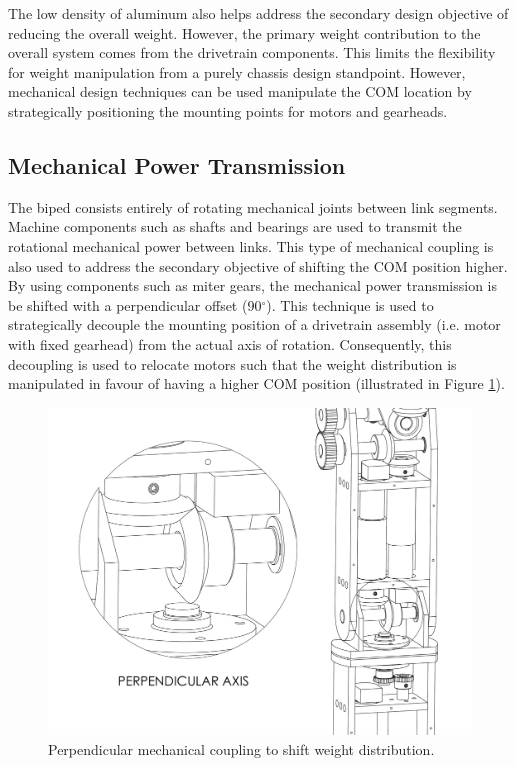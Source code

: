The low density of aluminum also helps address the secondary design objective of reducing the overall weight. However, the primary weight contribution to the overall system comes from the drivetrain components. This limits the flexibility for weight manipulation from a purely chassis design standpoint. However, mechanical design techniques can be used manipulate the COM location by strategically positioning the mounting points for motors and gearheads. 

\subsection{Mechanical Power Transmission} %
\label{sub:mechanical_power_transmission}
The biped consists entirely of rotating mechanical joints between link segments. Machine components such as shafts and bearings are used to transmit the rotational mechanical power between links. This type of mechanical coupling is also used to address the secondary objective of shifting the COM position higher. By using components such as miter gears, the mechanical power transmission is be shifted with a perpendicular offset (90$^\circ$). This technique is used to strategically decouple the mounting position of a drivetrain assembly (i.e. motor with fixed gearhead) from the actual axis of rotation. Consequently, this decoupling is used to relocate motors such that the weight distribution is manipulated in favour of having a higher COM position (illustrated in Figure \ref{fig:miter}).
	
\begin{figure}[!h]
	\begin{center}
    \includegraphics[scale=0.5]{fig/design/perpendicular.pdf}
	\end{center}
  \caption{Perpendicular mechanical coupling to shift weight distribution.}
\label{fig:miter}
\end{figure}

